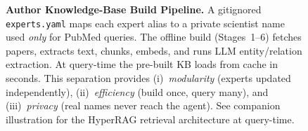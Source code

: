 \begin{figure}[htbp]
{\begin{tikzpicture}
\end{tikzpicture}%
}%
\caption{\textbf{Author Knowledge-Base Build Pipeline.}
A gitignored \texttt{experts.yaml} maps each expert alias to a
private scientist name used \emph{only} for PubMed queries.
The offline build (Stages~1--6) fetches papers, extracts text,
chunks, embeds, and runs LLM entity/relation extraction.
At query-time the pre-built KB loads from cache in seconds.
This separation provides
(i)~\emph{modularity} (experts updated independently),
(ii)~\emph{efficiency} (build once, query many), and
(iii)~\emph{privacy} (real names never reach the agent).
See companion illustration for the HyperRAG retrieval
architecture at query-time.}
\label{fig:closeup-author-kb}
\end{figure}
